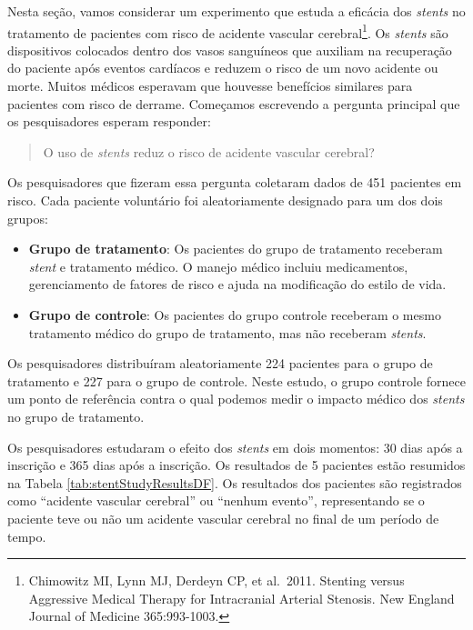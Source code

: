\documentclass[
]{book}
\theoremstyle{definition}
\theoremstyle{definition}
\theoremstyle{definition}
\theoremstyle{definition}
\theoremstyle{remark}
\begin{document}
Nesta seção, vamos considerar um experimento que estuda a eficácia dos \emph{stents} no tratamento de pacientes com risco de acidente vascular cerebral\footnote{Chimowitz MI, Lynn MJ, Derdeyn CP, et al.~2011. Stenting versus Aggressive Medical Therapy for Intracranial Arterial Stenosis. New England Journal of Medicine 365:993-1003.}. Os \emph{stents} são dispositivos colocados dentro dos vasos sanguíneos que auxiliam na recuperação do paciente após eventos cardíacos e reduzem o risco de um novo acidente ou morte. Muitos médicos esperavam que houvesse benefícios similares para pacientes com risco de derrame. Começamos escrevendo a pergunta principal que os pesquisadores esperam responder:

\begin{quote}
O uso de \emph{stents} reduz o risco de acidente vascular cerebral?
\end{quote}

Os pesquisadores que fizeram essa pergunta coletaram dados de 451 pacientes em risco. Cada paciente voluntário foi aleatoriamente designado para um dos dois grupos:

\begin{itemize}
\item
  \textbf{Grupo de tratamento}: Os pacientes do grupo de tratamento receberam \emph{stent} e tratamento médico. O manejo médico incluiu medicamentos, gerenciamento de fatores de risco e ajuda na modificação do estilo de vida.
\item
  \textbf{Grupo de controle}: Os pacientes do grupo controle receberam o mesmo tratamento médico do grupo de tratamento, mas não receberam \emph{stents}.
\end{itemize}

Os pesquisadores distribuíram aleatoriamente 224 pacientes para o grupo de tratamento e 227 para o grupo de controle. Neste estudo, o grupo controle fornece um ponto de referência contra o qual podemos medir o impacto médico dos \emph{stents} no grupo de tratamento.

Os pesquisadores estudaram o efeito dos \emph{stents} em dois momentos: 30 dias após a inscrição e 365 dias após a inscrição. Os resultados de 5 pacientes estão resumidos na Tabela \ref{tab:stentStudyResultsDF}. Os resultados dos pacientes são registrados como ``acidente vascular cerebral'' ou ``nenhum evento'', representando se o paciente teve ou não um acidente vascular cerebral no final de um período de tempo.
\end{document}
